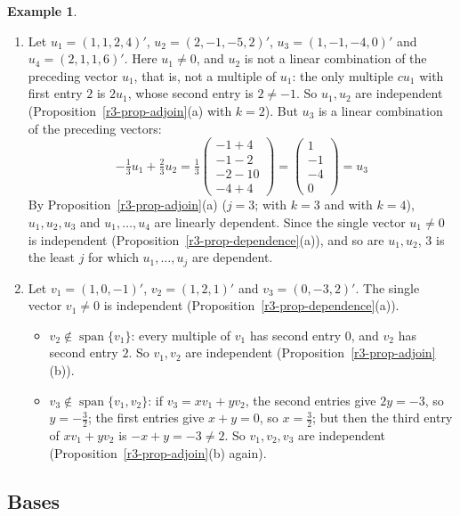 \documentclass[12pt]{article}
\DeclareMathOperator{\Span}{span}
\theoremstyle{definition}
\newtheorem{example}[theorem]{Example}
\begin{document}
\begin{example}\label{r3-exm-adjoin}
\begin{enumerate}
\item Let \(u_1=(1,1,2,4)'\), \(u_2=(2,-1,-5,2)'\), \(u_3=(1,-1,-4,0)'\) and \(u_4=(2,1,1,6)'\). Here \(u_1\ne0\), and
\(u_2\) is not a linear combination of the preceding vector \(u_1\), that is, not a multiple of \(u_1\): the only
multiple \(cu_1\) with first entry \(2\) is \(2u_1\), whose second entry is \(2\ne-1\). So \(u_1,u_2\) are independent
(Proposition~\ref{r3-prop-adjoin}(a) with \(k=2\)). But \(u_3\) is a linear combination of the preceding vectors:
\[
-\tfrac13u_1+\tfrac23u_2=\tfrac13\begin{pmatrix}-1+4\\-1-2\\-2-10\\-4+4\end{pmatrix}=\begin{pmatrix}1\\-1\\-4\\0\end{pmatrix}=u_3
\]
By Proposition~\ref{r3-prop-adjoin}(a) (\(j=3\); with \(k=3\) and with \(k=4\)), \(u_1,u_2,u_3\) and \(u_1,\dots,u_4\)
are linearly dependent. Since the single vector \(u_1\ne0\) is independent (Proposition~\ref{r3-prop-dependence}(a)),
and so are \(u_1,u_2\), \(3\) is the least \(j\) for which \(u_1,\dots,u_j\) are dependent.
\item Let \(v_1=(1,0,-1)'\), \(v_2=(1,2,1)'\) and \(v_3=(0,-3,2)'\). The single vector \(v_1\ne0\) is independent
(Proposition~\ref{r3-prop-dependence}(a)).
\begin{itemize}
\item \(v_2\notin\Span\{v_1\}\): every multiple of \(v_1\) has second entry \(0\), and \(v_2\) has second entry \(2\).
So \(v_1,v_2\) are independent (Proposition~\ref{r3-prop-adjoin}(b)).
\item \(v_3\notin\Span\{v_1,v_2\}\): if \(v_3=xv_1+yv_2\), the second entries give \(2y=-3\), so \(y=-\frac32\); the
first entries give \(x+y=0\), so \(x=\frac32\); but then the third entry of \(xv_1+yv_2\) is \(-x+y=-3\ne2\). So
\(v_1,v_2,v_3\) are independent (Proposition~\ref{r3-prop-adjoin}(b) again).
\end{itemize}
\end{enumerate}
\end{example}

\subsection*{Bases}
\end{document}
